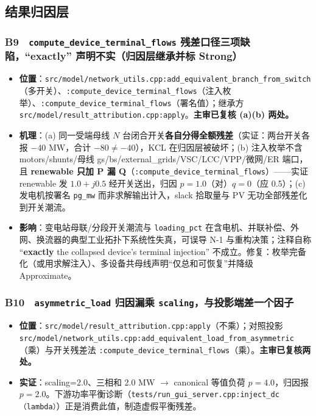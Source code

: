 \documentclass[11pt,a4paper,fontset=fandol]{ctexart}
\newcommand{\file}[1]{\texttt{#1}}
\begin{document}
\subsection{结果归因层}

\subsubsection*{B9　\texttt{compute\_device\_terminal\_flows} 残差口径三项缺陷，``exactly'' 声明不实（归因层继承并标 Strong）}
\begin{itemize}
  \item \textbf{位置}：\file{src/model/network\_utils.cpp:add\_equivalent\_branch\_from\_switch}（多开关）、\file{:compute\_device\_terminal\_flows}（注入枚举）、\file{:compute\_device\_terminal\_flows}（署名值）；继承方 \file{src/model/result\_attribution.cpp:apply}。\textbf{主审已复核 (a)(b) 两处。}
  \item \textbf{机理}：(a) 同一受端母线 $N$ 台闭合开关\textbf{各自分得全额残差}（实证：两台开关各报 $-40$ MW，合计 $-80\neq-40$），KCL 在归因层被破坏；(b) 注入枚举不含 motors/shunts/母线 gs/bs/external\_grids/VSC/LCC/VPP/微网/ER 端口，且 \textbf{renewable 只加 P 漏 Q}（\file{:compute\_device\_terminal\_flows}）——实证 renewable 发 $1.0+j0.5$ 经开关送出，归因 $p=1.0$（对）$q=0$（应 0.5）；(c) 发电机按署名 \texttt{pg\_mw} 而非求解输出计入，slack 拾取量与 PV 无功全部残差化到开关潮流。
  \item \textbf{影响}：变电站母联/分段开关潮流与 \texttt{loading\_pct} 在含电机、并联补偿、外网、换流器的典型工业拓扑下系统性失真，可误导 N-1 与重构决策；注释自称 ``\textbf{exactly} the collapsed device's terminal injection'' 不成立。修复：枚举完备化（或用求解注入）、多设备共母线声明``仅总和可恢复''并降级 Approximate。
\end{itemize}

\subsubsection*{B10　\texttt{asymmetric\_load} 归因漏乘 \texttt{scaling}，与投影端差一个因子}
\begin{itemize}
  \item \textbf{位置}：\file{src/model/result\_attribution.cpp:apply}（不乘）；对照投影 \file{src/model/network\_utils.cpp:add\_equivalent\_load\_from\_asymmetric}（乘）与开关残差法 \file{:compute\_device\_terminal\_flows}（乘）。\textbf{主审已复核两处。}
  \item \textbf{实证}：scaling=2.0、三相和 2.0 MW $\to$ canonical 等值负荷 $p=4.0$，归因报 $p=2.0$。下游功率平衡诊断（\file{tests/run\_gui\_server.cpp:inject\_dc（lambda）}）正是消费此值，制造虚假平衡残差。
\end{itemize}
\end{document}
